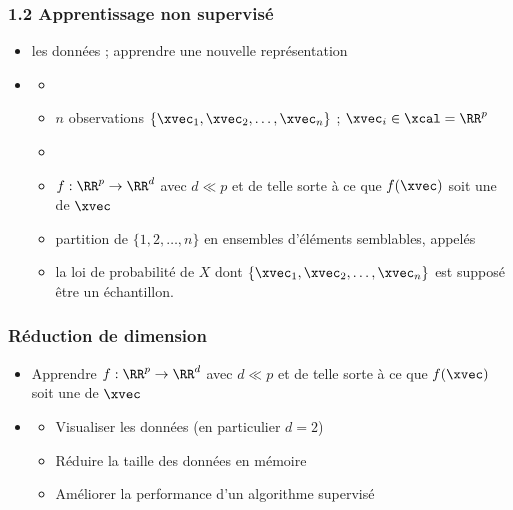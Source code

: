 \begin{frame}
  \frametitle{1.2 Apprentissage non supervisé}
  \begin{center}
  \end{center}
  \begin{itemize}
  \item {}  les données ; apprendre une nouvelle représentation
  \pause
  \item {}
    \begin{itemize}
    \item[]  
    \item[] $n$ observations $\{\xvec_1, \xvec_2, \dots, \xvec_n\}$ ; $\xvec_i \in \xcal = \RR^p$
      \vspace{.5em}
    \item[] 
    \pause
      \item {} $f : \RR^p \rightarrow \RR^d$ avec
        $d \ll p$ et de telle sorte à ce que $f(\xvec)$ soit une
         de $\xvec$
      \pause
      \item {} partition de $\{1, 2, \dots, n\}$ en ensembles
        d'éléments semblables, appelés 
      \pause
      \item {} la loi de probabilité de $X$ dont
        $\{\xvec_1, \xvec_2, \dots, \xvec_n\}$ est supposé être un échantillon.
    \end{itemize}
  \end{itemize}
\end{frame}

\begin{frame}
  \frametitle{Réduction de dimension}
  \begin{itemize}
  \item[] Apprendre $f : \RR^p \rightarrow \RR^d$ avec $d \ll p$ et de telle
    sorte à ce que $f(\xvec)$ soit une  de
    $\xvec$
  \item {}
    \begin{itemize}
    \item Visualiser les données (en particulier $d=2$)
    \item Réduire la taille des données en mémoire
    \item Améliorer la performance d'un algorithme supervisé
    \end{itemize}
  \end{itemize}
\end{frame}

